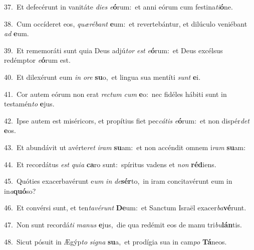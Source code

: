 {\numbfont\textcolor{\numbcolor}{37.}}~Et defecérunt in vanitáte \textit{di}\-\textit{es} \textit{e}\-\textbf{ó}rum:~\star et anni eórum cum festina\-\textit{ti}\-\textbf{ó}ne.\par
{\numbfont\textcolor{\numbcolor}{38.}}~Cum occíderet eos, \textit{quæ}\-\textit{ré}\textit{bant} \textbf{e}\-um:~\star et revertebántur, et dilúculo veniébant \textit{ad} \textbf{e}\-um.\par
{\numbfont\textcolor{\numbcolor}{39.}}~Et rememoráti sunt quia Deus adjú\textit{tor} \textit{est} \textit{e}\-\textbf{ó}rum:~\star et Deus excélsus redémptor \textit{e}\-\textbf{ó}rum est.\par
{\numbfont\textcolor{\numbcolor}{40.}}~Et dilexérunt eum \textit{in} \textit{o}\-\textit{re} \textbf{su}\-o,~\star et lingua sua mentíti \textit{sunt} \textbf{e}\-i.\par
{\numbfont\textcolor{\numbcolor}{41.}}~Cor autem eórum non erat \textit{rec}\-\textit{tum} \textit{cum} \textbf{e}\-o:~\star nec fidéles hábiti sunt in testamén\textit{to} \textbf{e}\-jus.\par
{\numbfont\textcolor{\numbcolor}{42.}}~Ipse autem est miséricors, et propítius fiet pec\-\textit{cá}\-\textit{tis} \textit{e}\-\textbf{ó}rum:~\star et non dispér\textit{det} \textbf{e}\-os.\par
{\numbfont\textcolor{\numbcolor}{43.}}~Et abundávit ut avérte\textit{ret} \textit{i}\-\textit{ram} \textbf{su}\-am:~\star et non accéndit omnem i\textit{ram} \textbf{su}\-am:\par
{\numbfont\textcolor{\numbcolor}{44.}}~Et recordátus \textit{est} \textit{qui}\-\textit{a} \textbf{ca}\-ro sunt:~\star spíritus vadens et \textit{non} \textbf{réd}\-iens.\par
{\numbfont\textcolor{\numbcolor}{45.}}~Quóties exacerbavérunt e\textit{um} \textit{in} \textit{de}\-\textbf{sér}to,~\star in iram concitavérunt eum in in\-\textit{a}\-\textbf{quó}so?\par
{\numbfont\textcolor{\numbcolor}{46.}}~Et convérsi sunt, et ten\-\textit{ta}\-\textit{vé}\textit{runt} \textbf{De}\-um:~\star et Sanctum Israël exacer\-\textit{ba}\-\textbf{vé}runt.\par
{\numbfont\textcolor{\numbcolor}{47.}}~Non sunt recordá\textit{ti} \textit{ma}\-\textit{nus} \textbf{e}\-jus,~\star die qua redémit eos de manu tri\-\textit{bu}\-\textbf{lán}tis.\par
{\numbfont\textcolor{\numbcolor}{48.}}~Sicut pósuit in Ægýp\textit{to} \textit{si}\-\textit{gna} \textbf{su}\-a,~\star et prodígia sua in cam\textit{po} \textbf{Tá}\-neos.\par
